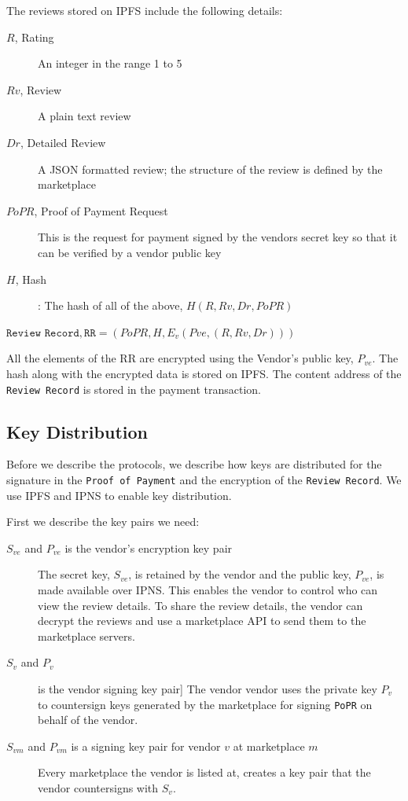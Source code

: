 \documentclass[a4paper]{article}
\begin{document}
The reviews stored on IPFS include the following details: 

\begin{description}
\item[$R$, Rating] An integer in the range 1 to 5
\item[$Rv$, Review] A plain text review
\item[$Dr$, Detailed Review] A JSON formatted review; the structure of
  the review is defined by the marketplace
\item[$PoPR$, Proof of Payment Request] This is the request for
  payment signed by the vendors secret key so that it can be verified
  by a vendor public key
\item[$H$, Hash]: The hash of all of the above, $H(R, Rv, Dr, PoPR)$
\end{description}

$\texttt{Review Record}, \texttt{RR} = (PoPR, H, E_v(Pve, (R, Rv, Dr)))$

All the elements of the RR are encrypted using the Vendor's public key,
$P_{ve}$.  The hash along with the encrypted data is stored on IPFS\@. The
content address of the \texttt{Review Record} is stored in the payment
transaction.

\subsection{Key Distribution}

Before we describe the protocols, we describe how keys are distributed
for the signature in the \texttt{Proof of Payment} and the encryption
of the \texttt{Review Record}. We use IPFS and IPNS to enable key
distribution.

First we describe the key pairs we need:

\begin{description}

\item[$S_{ve}$ and $P_{ve}$ is the vendor's encryption key pair] The
  secret key, $S_{ve}$, is retained by the vendor and the public key,
  $P_{ve}$, is made available over IPNS\cite{ipfs}. This enables the
  vendor to control who can view the review details. To share the
  review details, the vendor can decrypt the reviews and use a
  marketplace API to send them to the marketplace servers.

\item[$S_v$ and $P_v$] is the vendor signing key pair] The vendor
  vendor uses the private key $P_v$ to countersign keys generated by
  the marketplace for signing \texttt{PoPR} on behalf of the vendor.
  
\item[$S_{vm}$ and $P_{vm}$ is a signing key pair for vendor $v$ at
  marketplace $m$] Every marketplace the vendor is listed at, creates a
  key pair that the vendor countersigns with $S_v$.

\end{description}
\end{document}
